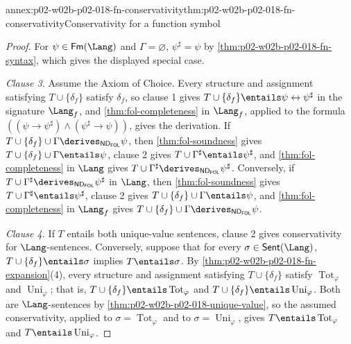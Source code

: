 \begin{annexitem}{annex:p02-w02b-p02-018-fn-conservativity}{thm:p02-w02b-p02-018-fn-conservativity}{Conservativity for a function symbol}
\begin{proof}
For \(\psi\in\mathsf{Fm}(\Lang)\) and \(\Gamma=\varnothing\),
\(\psi^{\sharp}=\psi\) by
\cref{thm:p02-w02b-p02-018-fn-syntax}, which gives the
displayed special case.

\emph{Clause 3.}  Assume the Axiom of Choice.  Every structure and
assignment satisfying \(T\cup\{\delta_f\}\) satisfy \(\delta_f\), so clause 1
gives \(T\cup\{\delta_f\}\entails\psi\leftrightarrow\psi^{\sharp}\) in the
signature \(\Lang_f\), and \cref{thm:fol-completeness} in \(\Lang_f\), applied
to the formula \(((\psi\to\psi^{\sharp})\land(\psi^{\sharp}\to\psi))\), gives
the derivation.  If
\(T\cup\{\delta_f\}\cup\Gamma\derives_{\mathsf{ND}_{\mathsf{FOL}}}\psi\), then
\cref{thm:fol-soundness} gives \(T\cup\{\delta_f\}\cup\Gamma\entails\psi\),
clause 2 gives \(T\cup\Gamma^{\sharp}\entails\psi^{\sharp}\), and
\cref{thm:fol-completeness} in \(\Lang\) gives
\(T\cup\Gamma^{\sharp}\derives_{\mathsf{ND}_{\mathsf{FOL}}}\psi^{\sharp}\).
Conversely, if
\(T\cup\Gamma^{\sharp}\derives_{\mathsf{ND}_{\mathsf{FOL}}}\psi^{\sharp}\) in
\(\Lang\), then \cref{thm:fol-soundness} gives
\(T\cup\Gamma^{\sharp}\entails\psi^{\sharp}\), clause 2 gives
\(T\cup\{\delta_f\}\cup\Gamma\entails\psi\), and \cref{thm:fol-completeness}
in \(\Lang_f\) gives
\(T\cup\{\delta_f\}\cup\Gamma\derives_{\mathsf{ND}_{\mathsf{FOL}}}\psi\).

\emph{Clause 4.}  If \(T\) entails both unique-value sentences, clause 2
gives conservativity for \(\Lang\)-sentences.  Conversely, suppose that for
every \(\sigma\in\mathsf{Sent}(\Lang)\),
\(T\cup\{\delta_f\}\entails\sigma\) implies \(T\entails\sigma\).  By
\cref{thm:p02-w02b-p02-018-fn-expansion}(4), every structure and
assignment satisfying \(T\cup\{\delta_f\}\) satisfy
\(\operatorname{Tot}_{\varphi}\) and \(\operatorname{Uni}_{\varphi}\); that
is, \(T\cup\{\delta_f\}\entails\operatorname{Tot}_{\varphi}\) and
\(T\cup\{\delta_f\}\entails\operatorname{Uni}_{\varphi}\).  Both are
\(\Lang\)-sentences by \cref{thm:p02-w02b-p02-018-unique-value}, so the
assumed conservativity, applied to \(\sigma=\operatorname{Tot}_{\varphi}\)
and to \(\sigma=\operatorname{Uni}_{\varphi}\), gives
\(T\entails\operatorname{Tot}_{\varphi}\) and
\(T\entails\operatorname{Uni}_{\varphi}\).
\end{proof}
\end{annexitem}

